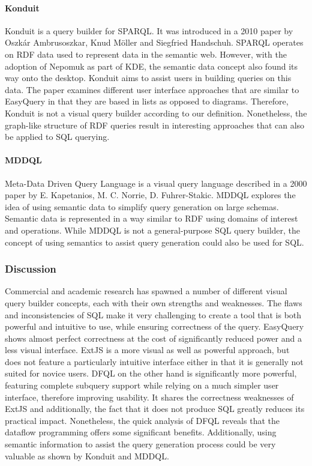 \documentclass[11pt,a4paper]{globis-book}
\begin{document}
\paragraph*{Konduit} Konduit is a query builder for SPARQL. It was introduced in a 2010 paper by Oszk{\'a}r Ambrusoszkar, Knud M\"oller and Siegfried Handschuh\cite{ambrus2010konduit}. SPARQL operates on RDF data used to represent data in the semantic web. However, with the adoption of Nepomuk as part of KDE, the semantic data concept also found its way onto the desktop. Konduit aims to assist users in building queries on this data. The paper examines different user interface approaches that are similar to EasyQuery in that they are based in lists as opposed to diagrams. Therefore, Konduit is not a visual query builder according to our definition. Nonetheless, the graph-like structure of RDF queries result in interesting approaches that can also be applied to SQL querying.

\paragraph*{MDDQL} Meta-Data Driven Query Language is a visual query language described in a 2000 paper by E. Kapetanios, M. C. Norrie, D. Fuhrer-Stakic\cite{kapetanios2000mddql}. MDDQL explores the idea of using semantic data to simplify query generation on large schemas. Semantic data is represented in a way similar to RDF using domains of interest and operations. While MDDQL is not a general-purpose SQL query builder, the concept of using semantics to assist query generation could also be used for SQL.

\subsubsection*{Discussion}
Commercial and academic research has spawned a number of different visual query builder concepts, each with their own strengths and weaknesses. The flaws and inconsistencies of SQL make it very challenging to create a tool that is both powerful and intuitive to use, while ensuring correctness of the query. EasyQuery shows almost perfect correctness at the cost of significantly reduced power and a less visual interface. ExtJS is a more visual as well as powerful approach, but does not feature a particularly intuitive interface either in that it is generally not suited for novice users. DFQL on the other hand is significantly more powerful, featuring complete subquery support while relying on a much simpler user interface, therefore improving usability. It shares the correctness weaknesses of ExtJS and additionally, the fact that it does not produce SQL greatly reduces its practical impact. Nonetheless, the quick analysis of DFQL reveals that the dataflow programming offers some significant benefits. Additionally, using semantic information to assist the query generation process could be very valuable as shown by Konduit and MDDQL.
\end{document}
